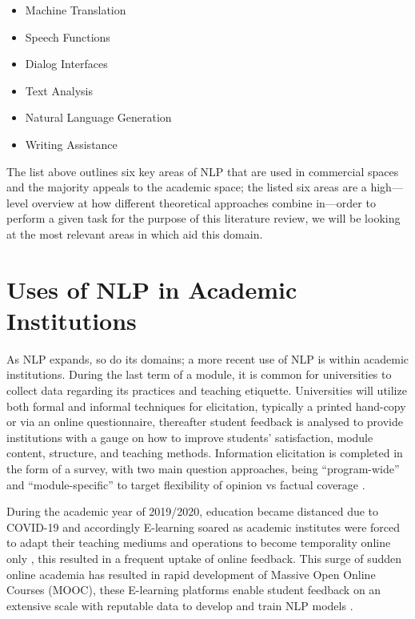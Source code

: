 \begin{itemize}
    \item Machine Translation
    \item Speech Functions
    \item Dialog Interfaces
    \item Text Analysis
    \item Natural Language Generation
    \item Writing Assistance
\end{itemize}

The list above outlines six key areas of NLP that are used in commercial spaces and the majority appeals to the academic space; the listed six areas are a high---level overview at how different theoretical approaches combine in---order to perform a given task \parencite{dale2019nlp} for the purpose of this literature review, we will be looking at the most relevant areas in which aid this domain.

\newpage

\section{Uses of NLP in Academic Institutions}

As NLP expands, so do its domains; a more recent use of NLP is within academic institutions. During the last term of a module, it is common for universities to collect data regarding its practices and teaching etiquette. Universities will utilize both formal and informal techniques for elicitation, typically a printed hand-copy or via an online questionnaire, thereafter student feedback is analysed to provide institutions with a gauge on how to improve students’ satisfaction, module content, structure, and teaching methods. Information elicitation is completed in the form of a survey, with two main question approaches, being “program-wide” and “module-specific” to target flexibility of opinion vs factual coverage \parencite{keane2005obtaining, beran2007s}.

During the academic year of 2019/2020, education became distanced due to COVID-19 and accordingly E-learning soared as academic institutes were forced to adapt their teaching mediums and operations to become temporality online only \parencite{burgess2020schools}, this resulted in a frequent uptake of online feedback. This surge of sudden online academia has resulted in rapid development of Massive Open Online Courses (MOOC), these E-learning platforms enable student feedback on an extensive scale with reputable data to develop and train NLP models \parencite{wang2021predicting}.

